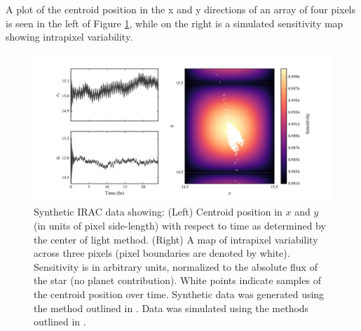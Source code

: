 \documentclass[twocolumn]{aastex61}
\begin{document}
A plot of the centroid position in the x and y directions of an array of four pixels is seen in the left of Figure \ref{fig:sens_cent}, while on the right is a simulated sensitivity map showing intrapixel variability.

\begin{figure}
 \includegraphics[width=\linewidth]{figs/smap_centroid.png}
 \caption{\small Synthetic IRAC data showing: (Left) Centroid position in $x$ and $y$ (in units of pixel side-length) with respect to time as determined by the center of light method. (Right) A map of intrapixel variability across three pixels (pixel boundaries are denoted by white). Sensitivity is in arbitrary units, normalized to the absolute flux of the star (no planet contribution). White points indicate samples of the centroid position over time. Synthetic data was generated using the method outlined in \citet{schwartz2016}. Data was simulated using the methods outlined in \citet{grillmair2014}.}
 \label{fig:sens_cent}
\end{figure}
\end{document}
